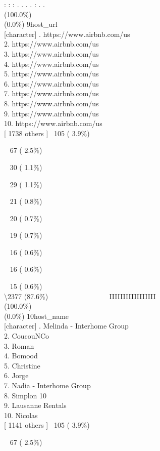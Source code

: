 \documentclass[
  journal,
]{IEEEtran}%
\begin{document}
: : : . . . . : . . \\
(100.0\%) \\
(0.0\%) \textbar{} \textbar{} 9\textbar host\_url\\
{[}character{]} . https://www.airbnb.com/us\\
2. https://www.airbnb.com/us\\
3. https://www.airbnb.com/us\\
4. https://www.airbnb.com/us\\
5. https://www.airbnb.com/us\\
6. https://www.airbnb.com/us\\
7. https://www.airbnb.com/us\\
8. https://www.airbnb.com/us\\
9. https://www.airbnb.com/us\\
10. https://www.airbnb.com/us\\
{[} 1738 others {]} \textbar~105 ( 3.9\%)\\
\strut ~ 67 ( 2.5\%)\\
\strut ~ 30 ( 1.1\%)\\
\strut ~ 29 ( 1.1\%)\\
\strut ~ 21 ( 0.8\%)\\
\strut ~ 20 ( 0.7\%)\\
\strut ~ 19 ( 0.7\%)\\
\strut ~ 16 ( 0.6\%)\\
\strut ~ 16 ( 0.6\%)\\
\strut ~ 15 ( 0.6\%)\\
\textbackslash2377 (87.6\%) \textbar{} \textbar~ ~ ~ ~ ~ ~ ~ ~ ~ ~
IIIIIIIIIIIIIIIII \\
(100.0\%) \\
(0.0\%) \textbar{} \textbar{} 10\textbar host\_name\\
{[}character{]} . Melinda - Interhome Group\\
2. CoucouNCo\\
3. Roman\\
4. Bomood\\
5. Christine\\
6. Jorge\\
7. Nadia - Interhome Group\\
8. Simplon 10\\
9. Lausanne Rentals\\
10. Nicolas\\
{[} 1141 others {]} \textbar~105 ( 3.9\%)\\
\strut ~ 67 ( 2.5\%)\\
\end{document}
